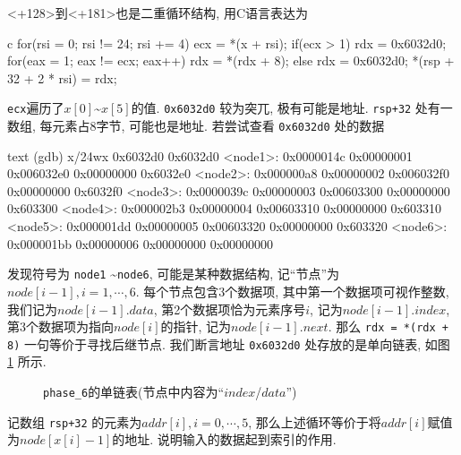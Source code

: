 <+128>到<+181>也是二重循环结构, 用C语言表达为
\begin{code}{c}
for(rsi = 0; rsi != 24; rsi += 4) {
    ecx = *(x + rsi);
    if(ecx > 1){
        rdx = 0x6032d0;
        for(eax = 1; eax != ecx; eax++) rdx = *(rdx + 8);
    } else
        rdx = 0x6032d0;
    *(rsp + 32 + 2 * rsi) = rdx;
}
\end{code}
\verb|ecx|遍历了$x[0]$\textasciitilde$x[5]$的值. \verb|0x6032d0| 较为突兀, 极有可能是地址. \verb|rsp+32| 处有一数组, 每元素占8字节, 可能也是地址. 若尝试查看 \verb|0x6032d0| 处的数据
\begin{code}{text}
(gdb) x/24wx 0x6032d0
0x6032d0 <node1>:       0x0000014c      0x00000001      0x006032e0      0x00000000
0x6032e0 <node2>:       0x000000a8      0x00000002      0x006032f0      0x00000000
0x6032f0 <node3>:       0x0000039c      0x00000003      0x00603300      0x00000000
0x603300 <node4>:       0x000002b3      0x00000004      0x00603310      0x00000000
0x603310 <node5>:       0x000001dd      0x00000005      0x00603320      0x00000000
0x603320 <node6>:       0x000001bb      0x00000006      0x00000000      0x00000000
\end{code}
发现符号为 \verb|node1| \textasciitilde \verb|node6|, 可能是某种数据结构, 记“节点”为$node[i-1],i=1,\cdots,6$. 每个节点包含3个数据项, 其中第一个数据项可视作整数, 我们记为$node[i-1].data$, 第2个数据项恰为元素序号$i$, 记为$node[i-1].index$, 第3个数据项为指向$node[i]$的指针, 记为$node[i-1].next$. 那么 \verb|rdx = *(rdx + 8)| 一句等价于寻找后继节点. 我们断言地址 \verb|0x6032d0| 处存放的是单向链表, 如图 \ref{fig:list} 所示.

\begin{figure}[H]
    \centering
    \small
    \usetikzlibrary {arrows.meta}
    \caption{\texttt{phase_6}的单链表(节点中内容为“$index$/$data$”)}\label{fig:list}
\end{figure}
记数组 \verb|rsp+32| 的元素为$addr[i],i=0,\cdots,5$, 那么上述循环等价于将$addr[i]$赋值为$node[x[i]-1]$的地址. 说明输入的数据起到索引的作用.

